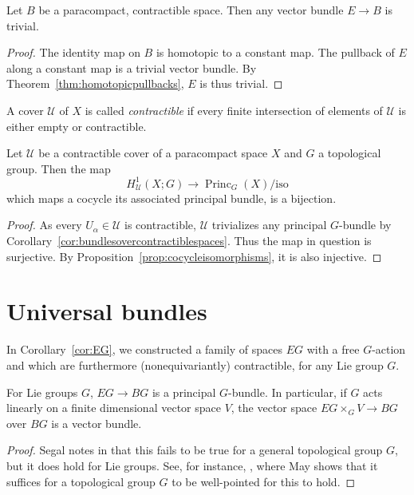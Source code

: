 \documentclass[a4paper,openany]{scrbook}
\DeclareMathOperator{\Princ}{Princ}
\begin{document}
\begin{corollary}\label{cor:bundlesovercontractiblespaces}
Let $B$ be a paracompact, contractible space. Then any vector bundle $E \to B$ is trivial.
\end{corollary}
\begin{proof}
The identity map on $B$ is homotopic to a constant map. The pullback of $E$ along a constant map is a trivial vector bundle. By Theorem~\ref{thm:homotopicpullbacks}, $E$ is thus trivial.
\end{proof}

\begin{defn} A cover $\mathcal U$ of $X$ is called \emph{contractible} if every finite intersection of elements of $\mathcal U$ is either empty or contractible.
\end{defn}

\begin{corollary}\label{cor:H1realizedoncontractiblecovers}
Let $\mathcal U$ be a contractible cover of a paracompact space $X$ and $G$ a topological group. Then the map
\[
H^1_{\mathcal U}(X;G) \to \Princ_G(X)/\text{iso}
\]
which maps a cocycle its associated principal bundle, is a bijection.
\end{corollary}
\begin{proof}
As every $U_\alpha \in \mathcal U$ is contractible, $\mathcal U$ trivializes any principal $G$-bundle by Corollary~\ref{cor:bundlesovercontractiblespaces}. Thus the map in question is surjective. By Proposition~\ref{prop:cocycleisomorphisms}, it is also injective.
\end{proof}

\section{Universal bundles}

In Corollary~\ref{cor:EG}, we constructed a family of spaces $EG$ with a free $G$-action and which are furthermore (nonequivariantly) contractible, for any Lie group $G$. 

\begin{lemma}
For Lie groups $G$, $EG \to BG$ is a principal $G$-bundle. In particular, if $G$ acts linearly on a finite dimensional vector space $V$, the vector space $EG \times_G V \to BG$ over $BG$ is a vector bundle.
\end{lemma}
\begin{proof}
Segal notes in \cite{segal:68} that this fails to be true for a general topological group $G$, but it does hold for Lie groups. See, for instance, \cite{may:classifying-spaces}, where May shows that it suffices for a topological group $G$ to be well-pointed for this to hold.
\end{proof}
\end{document}
